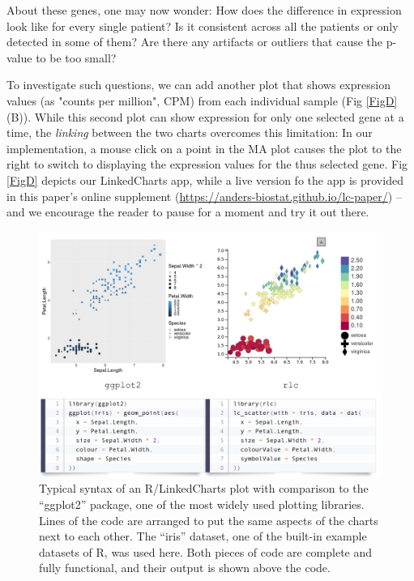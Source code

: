 \documentclass[twocolumn,10pt]{article}
\begin{document}
About these genes, one may now wonder: How does the difference in expression look like for every single patient? Is it consistent across all the patients or only detected in some of them? Are there any artifacts or outliers that cause the p-value to be too small?

To investigate such questions, we can add another plot that shows expression values (as "counts per million", CPM) from each individual sample (Fig \ref{FigD}(B)). While this second plot can show expression for only one selected gene at a time, the \emph{linking} between the two charts overcomes this limitation: In our implementation, a mouse click on a point in the MA plot causes the plot to the right to switch to displaying the expression values for the thus selected gene. Fig \ref{FigD} depicts our LinkedCharts app, while a live version fo the app is provided in this paper's online supplement (\url{https://anders-biostat.github.io/lc-paper/}) -- and we encourage the reader to pause for a moment and try it out there. 

\begin{figure}[t]
	\includegraphics[width=\textwidth]{FigB/figB.png}
	\caption{Typical syntax of an R/LinkedCharts plot with comparison to the ``ggplot2'' \citep{wickham_2016} package, one of the most widely used plotting libraries. Lines of the code are arranged to put the same aspects of the charts next to each other. The ``iris'' dataset, one of the built-in example datasets of R, was used here. Both pieces of code are complete and fully functional, and their output is shown above the code.}
	\label{FigB}
\end{figure}
\end{document}
